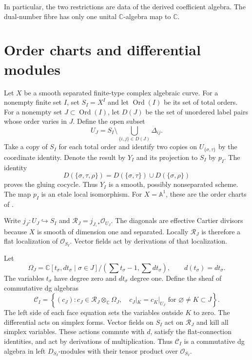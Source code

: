 In particular, the two restrictions are data of the derived
coefficient algebra. The dual-number fibre has only one unital
$\mathbb C$-algebra map to $\mathbb C$.

\section{Order charts and differential modules}

Let $X$ be a smooth separated finite-type complex algebraic curve.
For a nonempty finite set $I$, set $S_I=X^I$ and let
$\operatorname{Ord}(I)$ be its set of total orders.
For a nonempty set $J\subset\operatorname{Ord}(I)$, let $D(J)$
be the set of unordered label pairs whose order varies in $J$.
Define the open subset
\[
 U_J=S_I\setminus\bigcup_{\{i,j\}\in D(J)}\Delta_{ij}.
\]
Take a copy of $S_I$ for each total order and identify two copies
on $U_{\{\sigma,\tau\}}$ by the coordinate identity. Denote the
result by $Y_I$ and its projection to $S_I$ by $p_I$.
The identity
\[
 D(\{\sigma,\tau,\rho\})
 =D(\{\sigma,\tau\})\cup D(\{\sigma,\rho\})
\]
proves the gluing cocycle. Thus $Y_I$ is a smooth, possibly
nonseparated scheme. The map $p_I$ is an etale local isomorphism.
For $X=\mathbb A^1$, these are the order charts of
\cite[\S\S4.1--4.2]{AKY24}.

Write $j_J:U_J\hookrightarrow S_I$ and
$\mathcal R_J=j_{J,*}\mathcal O_{U_J}$.
The diagonals are effective Cartier divisors because $X$ is smooth
of dimension one and separated. Locally $\mathcal R_J$ is therefore
a flat localization of $\mathcal O_{S_I}$. Vector fields act by
derivations of that localization.

Let
\[
 \Omega_J=\mathbb C[t_\sigma,dt_\sigma\mid\sigma\in J]
 \big/\left(\sum t_\sigma-1,\sum dt_\sigma\right),
 \qquad d(t_\sigma)=dt_\sigma.
\]
The variables $t_\sigma$ have degree zero and $dt_\sigma$ degree
one. Define the sheaf of commutative dg algebras
\[
 \mathcal C_I=
 \left\{(c_J):c_J\in\mathcal R_J\otimes_{\mathbb C}\Omega_J,
 \quad c_J|_K=c_K|_{U_J}\text{ for }\varnothing\ne K\subset J\right\}.
\]
The left side of each face equation sets the variables outside $K$
to zero. The differential acts on simplex forms. Vector fields on
$S_I$ act on $\mathcal R_J$ and kill all simplex variables. These
actions commute with $d$, satisfy the flat-connection identities,
and act by derivations of multiplication. Thus $\mathcal C_I$ is
a commutative dg algebra in left $D_{S_I}$-modules with their
tensor product over $\mathcal O_{S_I}$.

